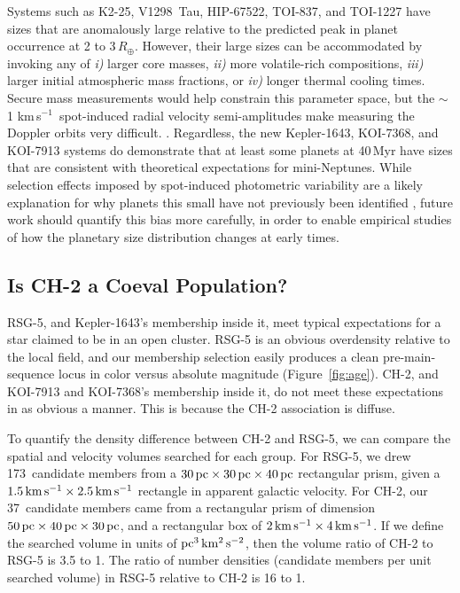 \documentclass[12pt,twocolumn]{aastex63}
\newcommand{\nchtwo}{37} %
\newcommand{\nrsgfive}{173} %
\newcommand{\kms}{\,km\,s$^{-1}$}
\newcommand{\mkms}{{\rm \,km\,s^{-1}}}  %
\begin{document}
Systems such as K2-25, V1298~Tau, HIP-67522, TOI-837, and TOI-1227
have sizes that are anomalously large relative to the predicted peak
in planet occurrence at 2 to 3\,$R_\oplus$.  However, their large
sizes can be accommodated by invoking any of {\it i)} larger core
masses, {\it ii)} more volatile-rich compositions, {\it iii)}  larger
initial atmospheric mass fractions, or {\it iv)} longer thermal
cooling times.  Secure mass measurements would help constrain this
parameter space, but the $\sim$1\,\kms\ spot-induced radial velocity
semi-amplitudes make measuring the Doppler orbits very difficult.
\citep[][]{cale_diving_2021,zicher_one_2022,klein_one_2022}.
Regardless, the new Kepler-1643, KOI-7368, and KOI-7913 systems do
demonstrate that at least some planets at 40\,Myr have sizes that are
consistent with theoretical expectations for mini-Neptunes.  While
selection effects imposed by spot-induced photometric variability are
a likely explanation for why planets this small have not previously
been identified \citep[{e.g.},][]{zhou_2021_tois}, future work should
quantify this bias more carefully, in order to enable empirical
studies of how the planetary size distribution changes at early times.


\subsection{Is CH-2 a Coeval Population?}
\label{subsec:ch2}

RSG-5, and Kepler-1643's membership inside it, meet typical
expectations for a star claimed to be in an open cluster.  RSG-5 is an
obvious overdensity relative to the local field, and our membership
selection easily produces a clean pre-main-sequence locus in color
versus absolute magnitude (Figure~\ref{fig:age}).  CH-2, and KOI-7913
and KOI-7368's membership inside it, do not meet these expectations in
as obvious a manner.  This is because the CH-2 association is diffuse.

To quantify the density difference between CH-2 and RSG-5, we can
compare the spatial and velocity volumes searched for each group.  For
RSG-5, we drew \nrsgfive\ candidate members from a $30\,{\rm
pc}\times30\,{\rm pc}\times40\,{\rm pc}$ rectangular prism, given a
$1.5 {\rm \mkms} \times 2.5 {\rm \mkms }$ rectangle in apparent
galactic velocity.  For CH-2, our \nchtwo\ candidate members came from
a rectangular prism of dimension $50\,{\rm pc}\times40\,{\rm
pc}\times30\,{\rm pc}$, and a rectangular box of $2 {\rm \mkms} \times
4 {\rm \mkms}$.  If we define the searched volume in units of ${\rm
pc}^3\,{\rm km^2}\,{\rm s^{-2}}$, then the volume ratio of CH-2 to
RSG-5 is 3.5 to 1.  The ratio of number densities (candidate members
per unit searched volume) in RSG-5 relative to CH-2 is 16 to 1.
\end{document}
